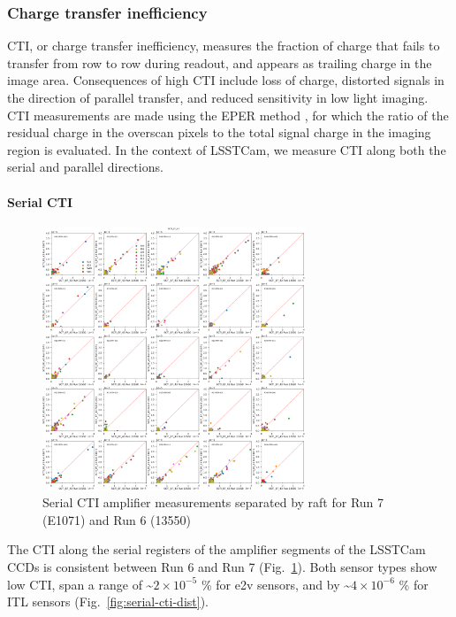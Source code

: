 \subsubsection{Charge transfer
inefficiency}\label{charge-transfer-inefficiency}

CTI, or charge transfer inefficiency, measures the fraction of charge that fails to transfer from row to row during readout, and appears as trailing charge in the image area. Consequences of high CTI include loss of charge, distorted signals in the direction of parallel transfer, and reduced sensitivity in low light imaging. CTI measurements are made using the EPER method \citep{2021JATIS...7d8002S}, for which the ratio of the residual charge in the overscan pixels to the total signal charge in the imaging region is evaluated. In the context of LSSTCam, we measure CTI along both the serial and parallel directions.

\paragraph{Serial CTI}\label{serial-cti}

\begin{figure}[H]
\begin{centering}
\includegraphics[width=0.7\textwidth]{figures/baselineCharacterization/13550_E1071_SCTI_EF_43_inset.png}
	\caption{Serial CTI amplifier measurements separated by raft for Run 7 (E1071) and Run 6 (13550)\label{fig:serial-cti}}
\end{centering}
\end{figure}

The CTI along the serial registers of the amplifier segments of the LSSTCam CCDs is consistent between Run 6 and
Run 7 (Fig.~\ref{fig:serial-cti}). Both sensor types show low CTI,
span a range  of \textasciitilde$2 \times 10^{-5}$ \% for e2v sensors, and
by \textasciitilde$4 \times 10^{-6}$  \% for ITL sensors (Fig.~\ref{fig:serial-cti-dist}).

